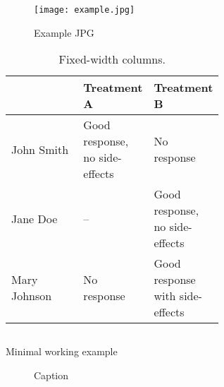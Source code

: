 \begin{figure}
    \centering
    \texttt{[image: example.jpg]}
    \caption{Example JPG}%
    \label{fig:example}
\end{figure}

\begin{table}[ht]
    \centering
    \caption{Fixed-width columns.}%
    \label{tab:example}
    \begin{tabular}[t]{l>{\raggedright}p{0.3\linewidth}>{\raggedright\arraybackslash}p{0.3\linewidth}}
        \toprule
                     & Treatment A                    & Treatment B                     \\
        \midrule
        John Smith   & Good response, no side-effects & No response                     \\
        Jane Doe     & --                             & Good response, no side-effects  \\
        Mary Johnson & No response                    & Good response with side-effects \\
        \bottomrule
    \end{tabular}
\end{table}%



\begin{listing}[ht]
    \inputminted{python}{code/example.py}
    \caption{Minimal working example}
    \label{listing:1}
\end{listing}

\begin{figure}
    \centering
    
    \caption{Caption}
    \label{fig:my_label}
\end{figure}
